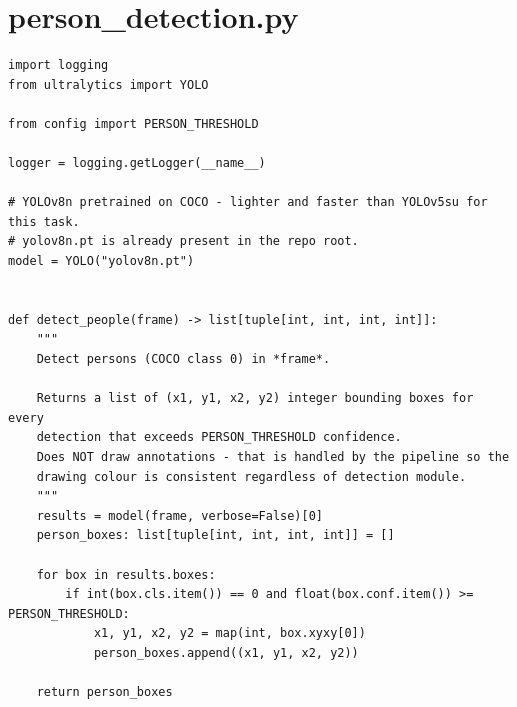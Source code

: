 \documentclass[12pt,a4paper]{report}
\begin{document}
\section{person\_detection.py}
\begin{lstlisting}
import logging
from ultralytics import YOLO

from config import PERSON_THRESHOLD

logger = logging.getLogger(__name__)

# YOLOv8n pretrained on COCO - lighter and faster than YOLOv5su for this task.
# yolov8n.pt is already present in the repo root.
model = YOLO("yolov8n.pt")


def detect_people(frame) -> list[tuple[int, int, int, int]]:
    """
    Detect persons (COCO class 0) in *frame*.

    Returns a list of (x1, y1, x2, y2) integer bounding boxes for every
    detection that exceeds PERSON_THRESHOLD confidence.
    Does NOT draw annotations - that is handled by the pipeline so the
    drawing colour is consistent regardless of detection module.
    """
    results = model(frame, verbose=False)[0]
    person_boxes: list[tuple[int, int, int, int]] = []

    for box in results.boxes:
        if int(box.cls.item()) == 0 and float(box.conf.item()) >= PERSON_THRESHOLD:
            x1, y1, x2, y2 = map(int, box.xyxy[0])
            person_boxes.append((x1, y1, x2, y2))

    return person_boxes
\end{lstlisting}

\end{document}
